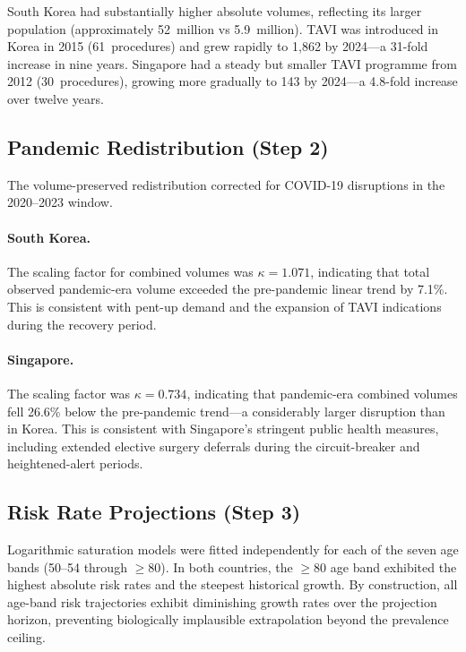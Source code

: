 \documentclass[12pt, a4paper]{article}
\begin{document}
South Korea had substantially higher absolute volumes, reflecting its larger population (approximately 52~million vs 5.9~million). TAVI was introduced in Korea in 2015 (61~procedures) and grew rapidly to 1{,}862 by 2024---a 31-fold increase in nine years. Singapore had a steady but smaller TAVI programme from 2012 (30~procedures), growing more gradually to 143 by 2024---a 4.8-fold increase over twelve years.

\subsection{Pandemic Redistribution (Step 2)}

The volume-preserved redistribution corrected for COVID-19 disruptions in the 2020--2023 window.

\paragraph{South Korea.}
The scaling factor for combined volumes was $\kappa = 1.071$, indicating that total observed pandemic-era volume exceeded the pre-pandemic linear trend by 7.1\%. This is consistent with pent-up demand and the expansion of TAVI indications during the recovery period.

\paragraph{Singapore.}
The scaling factor was $\kappa = 0.734$, indicating that pandemic-era combined volumes fell 26.6\% below the pre-pandemic trend---a considerably larger disruption than in Korea. This is consistent with Singapore's stringent public health measures, including extended elective surgery deferrals during the circuit-breaker and heightened-alert periods.

\subsection{Risk Rate Projections (Step 3)}

Logarithmic saturation models were fitted independently for each of the seven age bands (50--54 through $\geq$80). In both countries, the $\geq$80 age band exhibited the highest absolute risk rates and the steepest historical growth. By construction, all age-band risk trajectories exhibit diminishing growth rates over the projection horizon, preventing biologically implausible extrapolation beyond the prevalence ceiling.
\end{document}
